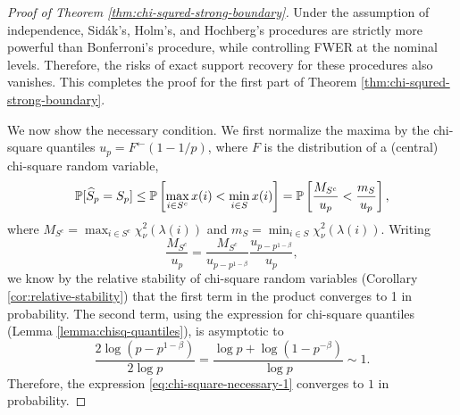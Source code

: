\begin{proof}[Proof of Theorem \ref{thm:chi-squred-strong-boundary}]
Under the assumption of independence, Sid\'ak's, Holm's, and Hochberg's procedures are strictly more powerful than Bonferroni's procedure, while controlling FWER at the nominal levels.
Therefore, the risks of exact support recovery for these procedures also vanishes.
This completes the proof for the first part of Theorem \ref{thm:chi-squred-strong-boundary}.

We now show the necessary condition. 
We first normalize the maxima by the chi-square quantiles $u_p = F^{\leftarrow}(1-1/p)$, where $F$ is the distribution of a (central) chi-square random variable,
\begin{equation} \label{eq:chi-square-necessary-0}
 \P[\widehat{S}_p = S_p] \le \P\left[\max_{i\in S^c}x(i) < \min_{i\in S}x(i)\right]
  = \P\left[ \frac{M_{S^c}}{u_p} < \frac{m_S}{u_p} \right],
\end{equation}
where $M_{S^c} = \max_{i\in S^c}\chi_\nu^2(\lambda(i))$ and $m_{S} = \min_{i\in S}\chi_\nu^2(\lambda(i))$.
Writing
\begin{equation} \label{eq:chi-square-necessary-1}
    \frac{M_{S^c}}{u_{p}} = \frac{M_{S^c}}{u_{p-p^{1-\beta}}} \frac{u_{p-p^{1-\beta}}}{u_{p}}, %
\end{equation}
we know by the relative stability of chi-square random variables (Corollary \ref{cor:relative-stability}) that the first term in the product converges to 1 in probability.
The second term, using the expression for chi-square quantiles (Lemma \ref{lemma:chisq-quantiles}), is asymptotic to 
$$
\frac{2\log{(p-p^{1-\beta})}}{2\log{p}} = \frac{\log{p}+\log{(1-p^{-\beta})}}{\log{p}} \sim 1.
$$
Therefore, the expression \eqref{eq:chi-square-necessary-1} converges to $1$ in probability.


\end{proof}
